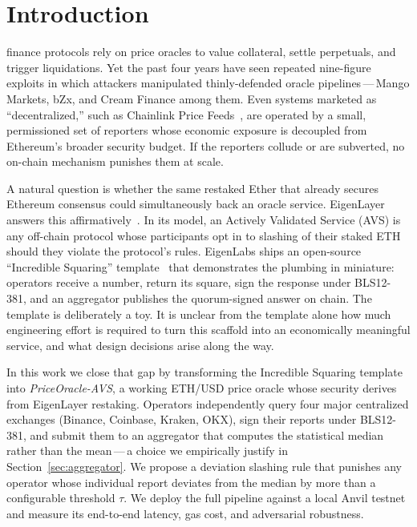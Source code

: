 \section{Introduction}
\label{sec:intro}

 finance protocols rely on price oracles
to value collateral, settle perpetuals, and trigger liquidations.
Yet the past four years have seen repeated nine-figure exploits in
which attackers manipulated thinly-defended oracle pipelines\,---\,Mango
Markets, bZx, and Cream Finance among them.  Even systems marketed as
``decentralized,'' such as Chainlink Price
Feeds~\cite{breidenbach2021chainlink}, are operated by a small,
permissioned set of reporters whose economic exposure is decoupled
from Ethereum's broader security budget.  If the reporters collude
or are subverted, no on-chain mechanism punishes them at scale.

A natural question is whether the same restaked Ether that already
secures Ethereum consensus could simultaneously back an oracle
service.  EigenLayer answers this affirmatively~\cite{eigenlayer2023}.
In its model, an Actively Validated Service (AVS) is any off-chain
protocol whose participants opt in to slashing of their staked ETH
should they violate the protocol's rules.  EigenLabs ships an
open-source ``Incredible Squaring'' template~\cite{layrlabs_isavs}
that demonstrates the plumbing in miniature: operators receive a
number, return its square, sign the response under BLS12-381, and an
aggregator publishes the quorum-signed answer on chain.  The template
is deliberately a toy.  It is unclear from the template alone how
much engineering effort is required to turn this scaffold into an
economically meaningful service, and what design decisions arise
along the way.

In this work we close that gap by transforming the Incredible
Squaring template into \emph{PriceOracle-AVS}, a working ETH/USD
price oracle whose security derives from EigenLayer restaking.
Operators independently query four major centralized exchanges
(Binance, Coinbase, Kraken, OKX), sign their reports under BLS12-381,
and submit them to an aggregator that computes the statistical
median rather than the mean\,---\,a choice we empirically justify in
Section~\ref{sec:aggregator}.  We propose a deviation slashing rule
that punishes any operator whose individual report deviates from
the median by more than a configurable threshold $\tau$.  We deploy
the full pipeline against a local Anvil testnet and measure its
end-to-end latency, gas cost, and adversarial robustness.

